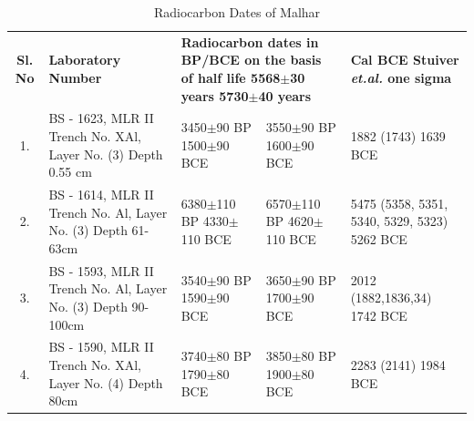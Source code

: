 {{\setlength\tabcolsep{2pt}
{\fontsize{7}{9}\selectfont
\begin{longtable}{|c|p{3.2cm}|p{1.5cm}|p{1.5cm}|p{1.8cm}|}
\captionsetup{font=footnotesize}
\caption{Radiocarbon Dates of Malhar}\label{table III.3}\\
\hline
\multicolumn{1}{|m{.5cm}|}{\centering \textbf{Sl. No}} &\multicolumn{1}{m{3.2cm}|}{\centering \textbf{Laboratory Number}}&\multicolumn{2}{m{3cm}|}{\centering \textbf{Radiocarbon dates in BP/BCE on the basis of half life 5568$\pm$30 years 5730$\pm$40 years}} &\multicolumn{1}{m{1.8cm}|}{\textbf{Cal BCE Stuiver {\it et.al.} one sigma}}\\
\hline
1. & BS - 1623, MLR II Trench No. XAl, Layer No. (3) Depth 0.55 cm & 3450$\pm$90 BP 1500$\pm$90 BCE & 3550$\pm$90 BP 1600$\pm$90 BCE & 1882 (1743) 1639 BCE\\
2. & BS - 1614, MLR II Trench No. Al, Layer No. (3) Depth 61-63cm & 6380$\pm$110 BP 4330$\pm$110 BCE & 6570$\pm$110 BP 4620$\pm$110 BCE & 5475 (5358, 5351, 5340, 5329, 5323) 5262 BCE\\
3. & BS - 1593, MLR II Trench No. Al, Layer No. (3) Depth 90-100cm &  3540$\pm$90 BP 1590$\pm$90 BCE & 3650$\pm$90 BP 1700$\pm$90 BCE & 2012 (1882,1836,34) 1742 BCE\\
4. & BS - 1590, MLR II Trench No. XAl, Layer No. (4) Depth 80cm & 3740$\pm$80 BP 1790$\pm$80 BCE & 3850$\pm$80 BP 1900$\pm$80 BCE & 2283 (2141) 1984 BCE\\
\hline
\end{longtable}
}}

}

